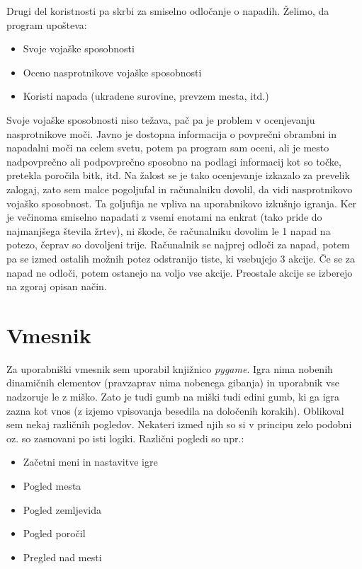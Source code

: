 \documentclass[a4paper, 16pt]{article}
\begin{document}
Drugi del koristnosti pa skrbi za smiselno odločanje o napadih. Želimo, da program upošteva:

\begin{itemize}
    \item Svoje vojaške sposobnosti
    \item Oceno nasprotnikove vojaške sposobnosti
    \item Koristi napada (ukradene surovine, prevzem mesta, itd.)
\end{itemize}

Svoje vojaške sposobnosti niso težava, pač pa je problem v ocenjevanju nasprotnikove moči. Javno je dostopna informacija o povprečni obrambni in napadalni moči na celem svetu, potem pa program sam oceni, ali je mesto nadpovprečno ali podpovprečno sposobno 
na podlagi informacij kot so točke, pretekla poročila bitk, itd. Na žalost se je tako ocenjevanje izkazalo za prevelik zalogaj, zato sem malce pogoljufal in računalniku dovolil, da vidi nasprotnikovo vojaško sposobnost. Ta goljufija ne vpliva na uporabnikovo izkušnjo
igranja. Ker je večinoma smiselno napadati z vsemi enotami na enkrat (tako pride do najmanjšega števila žrtev), ni škode, če računalniku dovolim le 1 napad na potezo, čeprav so dovoljeni trije. 
Računalnik se najprej odloči za napad, potem pa se izmed ostalih možnih potez odstranijo tiste, ki vsebujejo 3 akcije. Če se za napad ne odloči, potem ostanejo na voljo vse akcije. Preostale akcije se izberejo na zgoraj opisan način.

\section{Vmesnik}

Za uporabniški vmesnik sem uporabil knjižnico \textit{pygame}. Igra nima nobenih dinamičnih elementov (pravzaprav nima nobenega gibanja) in uporabnik vse nadzoruje le z miško.
Zato je tudi gumb na miški tudi edini gumb, ki ga igra zazna kot vnos (z izjemo vpisovanja besedila na določenih korakih). Oblikoval sem nekaj različnih pogledov. Nekateri izmed njih so si 
v principu zelo podobni oz. so zasnovani po isti logiki. Različni pogledi so npr.:

\begin{itemize}
    \item Začetni meni in nastavitve igre
    \item Pogled mesta
    \item Pogled zemljevida
    \item Pogled poročil
    \item Pregled nad mesti
\end{itemize}
\end{document}
